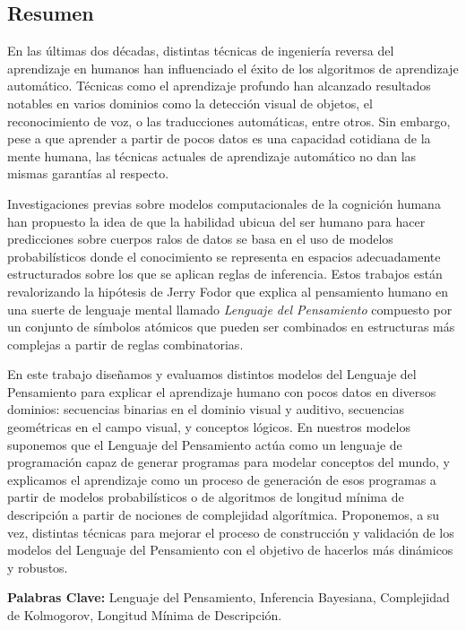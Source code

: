 
\rhead{}
\lhead{}
\renewcommand{\headrulewidth}{0pt}
\begin{center}
    \section*{Resumen}
\end{center}

En las últimas dos décadas, distintas técnicas de ingeniería reversa del aprendizaje en humanos han influenciado el éxito de los algoritmos de aprendizaje automático. Técnicas como el aprendizaje profundo han alcanzado resultados notables en varios dominios como la detección visual de objetos, el reconocimiento de voz, o las traducciones automáticas, entre otros. Sin embargo, pese a que aprender a partir de pocos datos es una capacidad cotidiana de la mente humana, las técnicas actuales de aprendizaje automático no dan las mismas garantías al respecto.

\medskip

Investigaciones previas sobre modelos computacionales de la cognición humana han propuesto la idea de que la habilidad ubicua del ser humano para hacer predicciones sobre cuerpos ralos de datos se basa en el uso de modelos probabilísticos donde el conocimiento se representa en espacios adecuadamente estructurados sobre los que se aplican reglas de inferencia. Estos trabajos están revalorizando la hipótesis de Jerry Fodor que explica al pensamiento humano en una suerte de lenguaje mental llamado {\em Lenguaje del Pensamiento} compuesto por un conjunto de símbolos atómicos que pueden ser combinados en estructuras más complejas a partir de reglas combinatorias.

\medskip

En este trabajo diseñamos y evaluamos distintos modelos del Lenguaje del Pensamiento para explicar el aprendizaje humano con pocos datos en diversos dominios: secuencias binarias en el dominio visual y auditivo, secuencias geométricas en el campo visual, y conceptos lógicos. En nuestros modelos suponemos que el Lenguaje del Pensamiento actúa como un lenguaje de programación capaz de generar programas para modelar conceptos del mundo, y explicamos el aprendizaje como un proceso de generación de esos programas a partir de modelos probabilísticos o de algoritmos de longitud mínima de descripción a partir de nociones de complejidad algorítmica. Proponemos, a su vez, distintas técnicas para mejorar el proceso de construcción y validación de los modelos del Lenguaje del Pensamiento con el objetivo de hacerlos más dinámicos y robustos.
\vfill


\noindent\textbf{Palabras Clave:} Lenguaje del Pensamiento, Inferencia Bayesiana, Complejidad de Kolmogorov, Longitud Mínima de Descripción.